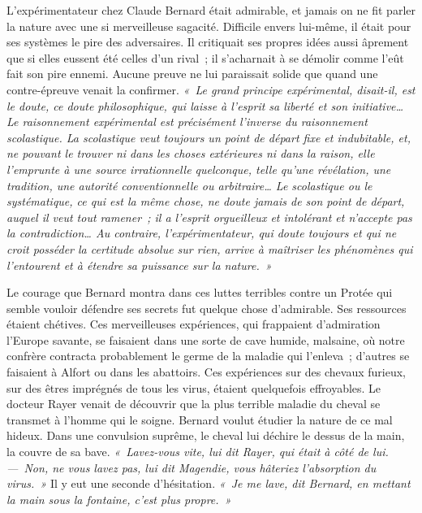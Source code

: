 \documentclass[french,twoside]{book} %
\newcommand\orgName[1]{#1}
\newcommand\persName[1]{#1}
\newcommand\placeName[1]{#1}
\begin{document}
L’expérimentateur chez {\persName Claude Bernard} était admirable, et jamais on ne fit parler la nature avec une si merveilleuse sagacité. Difficile envers lui-même, il était pour ses systèmes le pire des adversaires. Il critiquait ses propres idées aussi âprement que si elles eussent été celles d’un rival ; il s’acharnait à se démolir comme l’eût fait son pire ennemi. Aucune preuve ne lui paraissait solide que quand une contre-épreuve venait la confirmer. \emph{« Le grand principe expérimental, disait-il, est le doute, ce doute philosophique, qui laisse à l’esprit sa liberté et son initiative… Le raisonnement expérimental est précisément l’inverse du raisonnement scolastique. La scolastique veut toujours un point de départ fixe et indubitable, et, ne pouvant le trouver ni dans les choses extérieures ni dans la raison, elle l’emprunte à une source irrationnelle quelconque, telle qu’une révélation, une tradition, une autorité conventionnelle ou arbitraire… Le scolastique ou le systématique, ce qui est la même chose, ne doute jamais de son point de départ, auquel il veut tout ramener ; il a l’esprit orgueilleux et intolérant et n’accepte pas la contradiction… Au contraire, l’expérimentateur, qui doute toujours et qui ne croit posséder la certitude absolue sur rien, arrive à maîtriser les phénomènes qui l’entourent et à étendre sa puissance sur la nature. »}\par
Le courage que {\persName Bernard} montra dans ces luttes terribles contre un {\persName Protée} qui semble vouloir défendre ses secrets fut quelque chose d’admirable. Ses ressources étaient chétives. Ces merveilleuses expériences, qui frappaient d’admiration l’{\orgName Europe} savante, se faisaient dans une sorte de cave humide, malsaine, où notre confrère contracta probablement le germe de la maladie qui l’enleva ; d’autres se faisaient à {\placeName Alfort} ou dans les abattoirs. Ces expériences sur des chevaux furieux, sur des êtres imprégnés de tous les virus, étaient quelquefois effroyables. Le {\persName docteur Rayer} venait de découvrir que la plus terrible maladie du cheval se transmet à l’homme qui le soigne. {\persName Bernard} voulut étudier la nature de ce mal hideux. Dans une convulsion suprême, le cheval lui déchire le dessus de la main, la couvre de sa bave. \emph{« Lavez-vous vite, lui dit {\persName Rayer}, qui était à côté de lui. — Non, ne vous lavez pas, lui dit {\persName Magendie}, vous hâteriez l’absorption du virus. »} Il y eut une seconde d’hésitation. \emph{« Je me lave, dit {\persName Bernard}, en mettant la main sous la fontaine, c’est plus propre. »}\par
\end{document}
